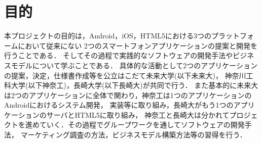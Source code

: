 \section{目的}
\par 本プロジェクトの目的は，Android，iOS，HTML5における3つのプラットフォームにおいて従来にない
2つのスマートフォンアプリケーションの提案と開発を行うことである．
そしてその過程で実践的なソフトウェアの開発手法やビジネスモデルについて学ぶことである．
具体的な活動として2つのアプリケーションの提案，決定，仕様書作成等を公立はこだて未来大学(以下未来大)，
神奈川工科大学(以下神奈工)，長崎大学(以下長崎大)が共同で行う．
また基本的に未来大は2つのアプリケーションに全体で関わり，神奈工は1つのアプリケーションのAndroidにおけるシステム開発，
実装等に取り組み，長崎大がもう1つのアプリケーションのサーバとHTML5に取り組み，
神奈工と長崎大は分かれてプロジェクトを進めていく．その過程でグループワークを通してソフトウェアの開発手法，
マーケティング調査の方法，ビジネスモデル構築方法等の習得を行う．
